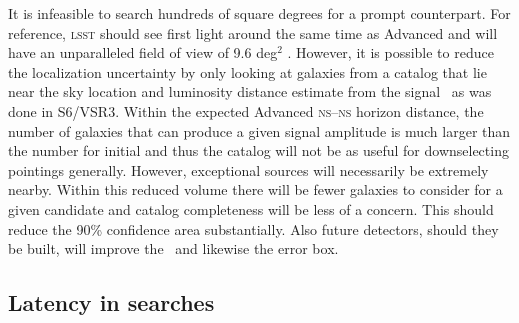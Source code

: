 It is infeasible to search hundreds of square degrees for a prompt counterpart.
For reference, \textsc{lsst} should see first light around the same time as
Advanced \LIGO{} and will have an unparalleled field of view of 9.6 deg$^2$
\citep{2008arXiv0805.2366I}.  However, 
it is possible to reduce the localization uncertainty by only looking at
galaxies from a catalog that lie near the sky location and luminosity distance
estimate from the \GW{} signal~\citep{galaxy-catalog} as was done in S6/VSR3.
Within the expected Advanced \LIGO{} \textsc{ns}--\textsc{ns} horizon distance,
the number of galaxies that can produce a given signal amplitude is much larger
than the number for initial \LIGO{} and thus the catalog will not be as useful
for downselecting pointings generally. However, exceptional \GW{} sources will
necessarily be extremely nearby. Within this reduced volume there will be fewer
galaxies to consider for a given candidate and catalog completeness will be
less of a concern.  This should reduce the 90\% confidence area substantially.
Also future \GW{} detectors, should they be built, will improve the \SNR\ and
likewise the error box.

\subsection{Latency in \CBC{} searches}

